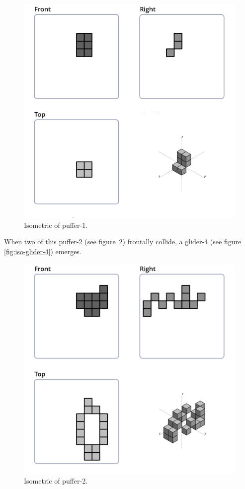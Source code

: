 \begin{figure}[H]
  \centering
  \includegraphics[scale=0.532]{iso_settings/puffer_1v.png}
  \caption{Isometric of puffer-1.}
  \label{fig:iso-puffer-1v}
\end{figure}

When two of this puffer-2 (see figure~\ref{fig:iso-puffer-2}) frontally collide,
a glider-4 (see figure \ref{fig:iso-glider-4}) emerges.
\begin{figure}[H]
	\centering
	\includegraphics[scale=0.532]{iso_settings/puffer_2.png}
	\caption{Isometric of puffer-2.}
  \label{fig:iso-puffer-2}
\end{figure}

